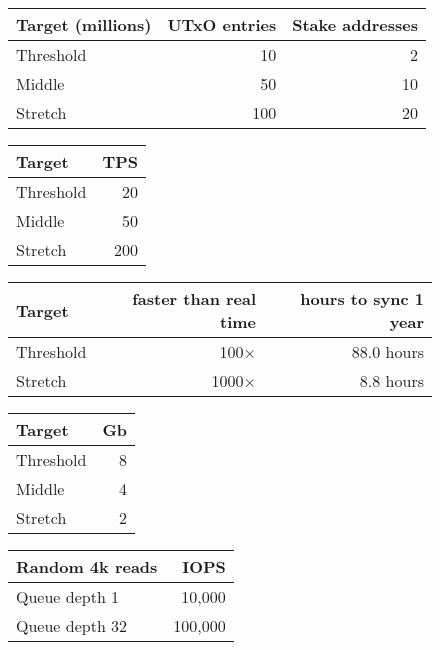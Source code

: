 \documentclass[11pt,a4paper]{article}
\begin{document}
\begin{figure}[t]
\begin{minipage}[b]{0.6\textwidth}
\centering
\begin{tabular}[]{lrr}
  Target (millions) & UTxO entries & Stake addresses \\
  \toprule
  Threshold &  10  &  2 \\
  Middle    &  50  & 10 \\
  Stretch   & 100  & 20
\end{tabular}
\label{table:ledger-targets}
\end{minipage}%
\begin{minipage}[b]{0.4\textwidth}
\centering
\begin{tabular}[]{lr}
  Target    & TPS \\
  \toprule
  Threshold &  20 \\
  Middle    &  50 \\
  Stretch   & 200
\end{tabular}
\label{table:tps-targets}
\end{minipage}

\vspace{2em}

\begin{minipage}[b]{0.6\textwidth}
\centering
\begin{tabular}[]{lrr}
  Target    & faster than real time & hours to sync 1 year \\
  \toprule
  Threshold &  100$\times$ & 88.0 hours \\
  Stretch   & 1000$\times$ &  8.8 hours
\end{tabular}
\label{table:sync-targets}
\end{minipage}%
\begin{minipage}[b]{0.4\textwidth}
\centering
\begin{tabular}[]{lr}
  Target & Gb \\
  \toprule
  Threshold &  8 \\
  Middle    &  4 \\
  Stretch   &  2
\end{tabular}
\label{table:memory-constraints}
\end{minipage}

\vspace{2em}

\centering
\begin{tabular}[]{lr}
  Random 4k reads & IOPS \\
  \toprule
  Queue depth 1  &  10,000 \\
  Queue depth 32 & 100,000 \\
\end{tabular}
\label{table:disk-iops-constraints}
\end{figure}
\end{document}
